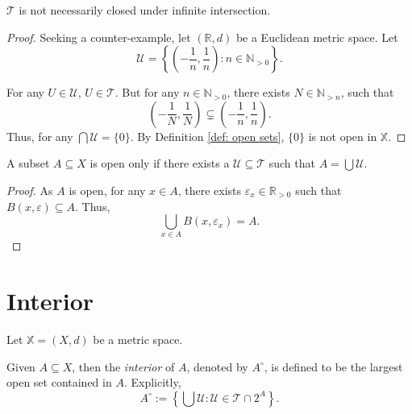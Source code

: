 \begin{theorem}
	\label{thm: topology might not close under infinite intersection}
	$\mathcal T$ is not necessarily closed under infinite intersection.
	
	\begin{proof}
		Seeking a counter-example, let $(\mathbb R, d)$ be a Euclidean metric space. Let
		$$
		\mathcal U = \left\{ \left( -\frac{1}{n}, \frac{1}{n} \right) : n \in \mathbb N_{>0} \right\}.
		$$
		
		For any $U \in \mathcal U$, $U \in \mathcal T$. But for any $n \in \mathbb N_{> 0}$, there exists $N \in \mathbb N_{> n}$, such that
		$$
		\left( -\frac{1}{N}, \frac{1}{N} \right) \subsetneq \left( -\frac{1}{n}, \frac{1}{n} \right).
		$$
		Thus, for any $\bigcap \mathcal U = \{0\}$. By Definition \ref{def: open sets}, $\{0\}$ is not open in $\mathbb X$.
	\end{proof}
\end{theorem}



\begin{corollary}
	\label{cor: open sets: only if union of open}
	A subset $A \subseteq X$ is open only if there exists a $\mathcal U \subseteq \mathcal T$ such that $A = \bigcup \mathcal U$.
	
	\begin{proof}
		As $A$ is open, for any $x \in A$, there exists $\varepsilon _x\in \mathbb R_{> 0}$ such that $B(x, \varepsilon) \subseteq A$. Thus,
		$$
		\bigcup_{x \in A} B(x, \varepsilon_x) = A.
		$$
	\end{proof}
\end{corollary}



\section{Interior}


\begin{definition}
	\label{def: interior}
	
	Let $\mathbb X = (X, d)$ be a metric space.
	
	Given $A \subseteq X$, then the \textit{interior} of $A$, denoted by $A^\circ$, is defined to be the largest open set contained in $A$. Explicitly,
	$$
	A^\circ := \left\{ \bigcup \mathcal U: \mathcal U \in \mathcal T \cap 2^A \right\}.
	$$
\end{definition}



